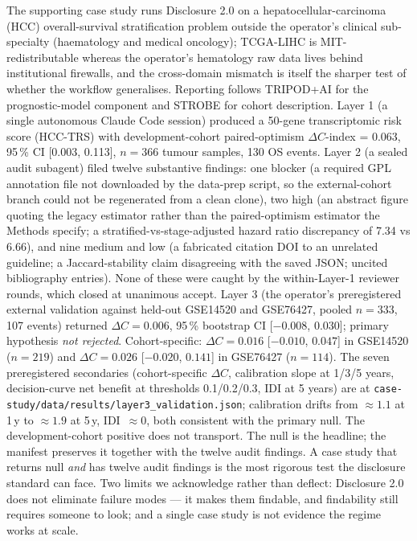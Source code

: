 \documentclass[11pt,a4paper]{article}
\begin{document}
The supporting case study runs Disclosure 2.0 on a hepatocellular-carcinoma (HCC) overall-survival stratification problem outside the operator's clinical sub-specialty (haematology and medical oncology); TCGA-LIHC is MIT-redistributable whereas the operator's hematology raw data lives behind institutional firewalls, and the cross-domain mismatch is itself the sharper test of whether the workflow generalises. Reporting follows TRIPOD+AI for the prognostic-model component and STROBE for cohort description. Layer 1 (a single autonomous Claude Code session) produced a 50-gene transcriptomic risk score (HCC-TRS) with development-cohort paired-optimism $\Delta C$-index = 0.063, 95\,\% CI [0.003, 0.113], $n=366$ tumour samples, 130 OS events. Layer 2 (a sealed audit subagent) filed twelve substantive findings: one blocker (a required GPL annotation file not downloaded by the data-prep script, so the external-cohort branch could not be regenerated from a clean clone), two high (an abstract figure quoting the legacy estimator rather than the paired-optimism estimator the Methods specify; a stratified-vs-stage-adjusted hazard ratio discrepancy of 7.34 vs 6.66), and nine medium and low (a fabricated citation DOI to an unrelated guideline; a Jaccard-stability claim disagreeing with the saved JSON; uncited bibliography entries). None of these were caught by the within-Layer-1 reviewer rounds, which closed at unanimous accept. Layer 3 (the operator's preregistered\citep{repoprereg} external validation against held-out GSE14520 and GSE76427, pooled $n=333$, 107 events) returned $\Delta C = 0.006$, 95\,\% bootstrap CI [$-0.008$, $0.030$]; primary hypothesis \emph{not rejected}. Cohort-specific: $\Delta C = 0.016$ [$-0.010$, $0.047$] in GSE14520 ($n=219$) and $\Delta C = 0.026$ [$-0.020$, $0.141$] in GSE76427 ($n=114$). The seven preregistered secondaries (cohort-specific $\Delta C$, calibration slope at 1/3/5 years, decision-curve net benefit at thresholds 0.1/0.2/0.3, IDI at 5 years) are at \texttt{case-study/data/results/layer3\_validation.json}; calibration drifts from $\approx 1.1$ at 1\,y to $\approx 1.9$ at 5\,y, IDI~$\approx 0$, both consistent with the primary null. The development-cohort positive does not transport. The null is the headline; the manifest preserves it together with the twelve audit findings. A case study that returns null \emph{and} has twelve audit findings is the most rigorous test the disclosure standard can face. Two limits we acknowledge rather than deflect: Disclosure 2.0 does not eliminate failure modes --- it makes them findable, and findability still requires someone to look; and a single case study is not evidence the regime works at scale.
\end{document}
